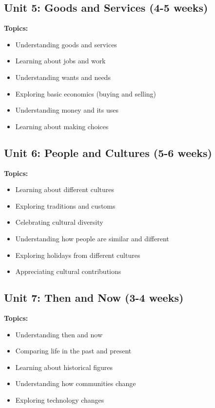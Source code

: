 \documentclass[11pt,letterpaper]{report}
\begin{document}
\subsection{Unit 5: Goods and Services (4-5 weeks)}

\textbf{Topics:}
\begin{itemize}
    \item Understanding goods and services
    \item Learning about jobs and work
    \item Understanding wants and needs
    \item Exploring basic economics (buying and selling)
    \item Understanding money and its uses
    \item Learning about making choices
\end{itemize}

\subsection{Unit 6: People and Cultures (5-6 weeks)}

\textbf{Topics:}
\begin{itemize}
    \item Learning about different cultures
    \item Exploring traditions and customs
    \item Celebrating cultural diversity
    \item Understanding how people are similar and different
    \item Exploring holidays from different cultures
    \item Appreciating cultural contributions
\end{itemize}

\subsection{Unit 7: Then and Now (3-4 weeks)}

\textbf{Topics:}
\begin{itemize}
    \item Understanding then and now
    \item Comparing life in the past and present
    \item Learning about historical figures
    \item Understanding how communities change
    \item Exploring technology changes
\end{itemize}
\end{document}
